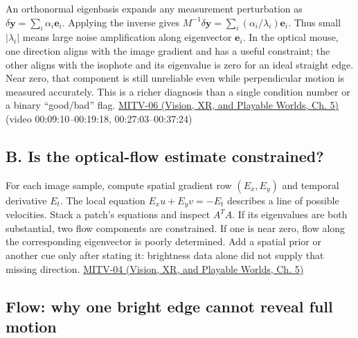 An orthonormal eigenbasis expands any measurement perturbation as \(\delta\mathbf y=\sum_i \alpha_i\mathbf e_i\). Applying the inverse gives \(M^{-1}\delta\mathbf y=\sum_i (\alpha_i/\lambda_i)\mathbf e_i\). Thus small \(|\lambda_i|\) means large noise amplification along eigenvector \(\mathbf e_i\). In the optical mouse, one direction aligns with the image gradient and has a useful constraint; the other aligns with the isophote and its eigenvalue is zero for an ideal straight edge. Near zero, that component is still unreliable even while perpendicular motion is measured accurately. This is a richer diagnosis than a single condition number or a binary ``good/bad'' flag. \href{../07-Vision-XR-and-Playable-Worlds/main.pdf\#nameddest=04-visual-computing-ii-ch036-mitv-06---photometric-stereo-noise-gain-error-amplification-eigenvalues-and-eigenvectors-review}{MITV-06 (Vision, XR, and Playable Worlds, Ch. 5)} (video 00:09:10--00:19:18, 00:27:03--00:37:24)

\subsection{B. Is the optical-flow estimate constrained?}\label{04-visual-computing-ii-ch030-b.-is-the-optical-flow-estimate-constrained}

\hypertarget{04-visual-computing-ii-ch030-b.-is-the-optical-flow-estimate-constrained}{}

For each image sample, compute spatial gradient row \((E_x,E_y)\) and temporal derivative \(E_t\). The local equation \(E_xu+E_yv=-E_t\) describes a line of possible velocities. Stack a patch's equations and inspect \(A^TA\). If its eigenvalues are both substantial, two flow components are constrained. If one is near zero, flow along the corresponding eigenvector is poorly determined. Add a spatial prior or another cue only after stating it: brightness data alone did not supply that missing direction. \href{../07-Vision-XR-and-Playable-Worlds/main.pdf\#nameddest=04-visual-computing-ii-ch036-mitv-04---fixed-optical-flow-optical-mouse-constant-brightness-assumption-closed-form-solution}{MITV-04 (Vision, XR, and Playable Worlds, Ch. 5)}

\subsection{Flow: why one bright edge cannot reveal full motion}\label{04-visual-computing-ii-ch030-flow-why-one-bright-edge-cannot-reveal-full-motion}

